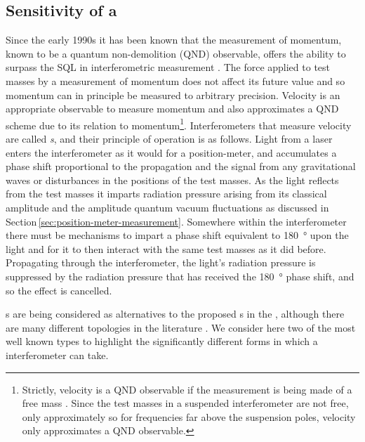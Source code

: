 \subsection{\label{sec:speed-meter-measurement}Sensitivity of a \SM{}}
Since the early 1990s it has been known that the measurement of momentum, known to be a quantum non-demolition (\gls{QND}) observable, offers the ability to surpass the \gls{SQL} in interferometric measurement \cite{Braginsky1990}. The force applied to test masses by a measurement of momentum does not affect its future value and so momentum can in principle be measured to arbitrary precision. Velocity is an appropriate observable to measure momentum and also approximates a \gls{QND} scheme due to its relation to momentum\footnote{Strictly, velocity is a \gls{QND} observable if the measurement is being made of a free mass \cite{Danilishin2012}. Since the test masses in a suspended interferometer are not free, only approximately so for frequencies far above the suspension poles, velocity only approximates a \gls{QND} observable.}. Interferometers that measure velocity are called \emph{\SM{}s}, and their principle of operation is as follows. Light from a laser enters the interferometer as it would for a position-meter, and accumulates a phase shift proportional to the propagation and the signal from any gravitational waves or disturbances in the positions of the test masses. As the light reflects from the test masses it imparts radiation pressure arising from its classical amplitude and the amplitude quantum vacuum fluctuations as discussed in Section\,\ref{sec:position-meter-measurement}. Somewhere within the interferometer there must be mechanisms to impart a phase shift equivalent to \SI{180}{\degree} upon the light and for it to then interact with the same test masses as it did before. Propagating through the interferometer, the light's radiation pressure is suppressed by the radiation pressure that has received the \SI{180}{\degree} phase shift, and so the effect is cancelled.

\SM{}s are being considered as alternatives to the proposed \MI{}s in the \ET{} \cite{MuellerEbhardt2009a, Voronchev2015}, although there are many different \SM{} topologies in the literature \cite{Danilishin2004, Wang2013, Huttner2016, Wade2012}. We consider here two of the most well known types to highlight the significantly different forms in which a \SM{} interferometer can take.

